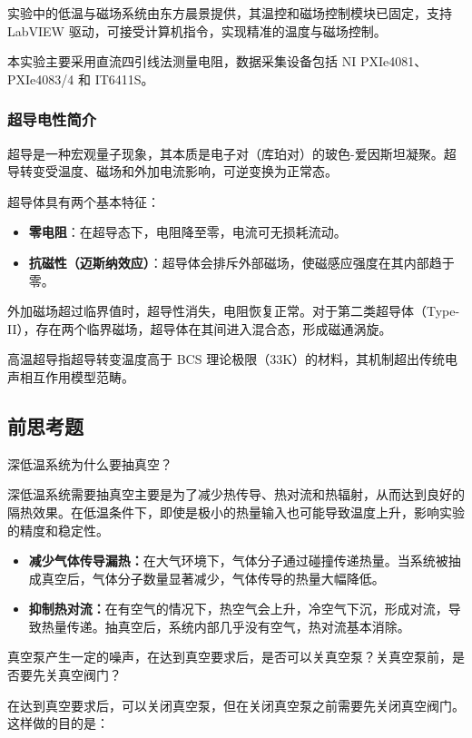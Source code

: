 实验中的低温与磁场系统由东方晨景提供，其温控和磁场控制模块已固定，支持 LabVIEW 驱动，可接受计算机指令，实现精准的温度与磁场控制。

本实验主要采用直流四引线法测量电阻，数据采集设备包括 NI PXIe4081、PXIe4083/4 和 IT6411S。

\subsubsection{超导电性简介}

超导是一种宏观量子现象，其本质是电子对（库珀对）的玻色-爱因斯坦凝聚。超导转变受温度、磁场和外加电流影响，可逆变换为正常态。

超导体具有两个基本特征：
\begin{itemize}
    \item \textbf{零电阻}：在超导态下，电阻降至零，电流可无损耗流动。
    \item \textbf{抗磁性（迈斯纳效应）}：超导体会排斥外部磁场，使磁感应强度在其内部趋于零。
\end{itemize}

外加磁场超过临界值时，超导性消失，电阻恢复正常。对于第二类超导体（Type-II），存在两个临界磁场，超导体在其间进入混合态，形成磁通涡旋。

高温超导指超导转变温度高于 BCS 理论极限（33K）的材料，其机制超出传统电声相互作用模型范畴。


\subsection{前思考题}
\begin{question}
    深低温系统为什么要抽真空？
\end{question}
深低温系统需要抽真空主要是为了减少热传导、热对流和热辐射，从而达到良好的隔热效果。在低温条件下，即使是极小的热量输入也可能导致温度上升，影响实验的精度和稳定性。

\begin{itemize}
    \item \textbf{减少气体传导漏热：}在大气环境下，气体分子通过碰撞传递热量。当系统被抽成真空后，气体分子数量显著减少，气体传导的热量大幅降低。
    \item \textbf{抑制热对流：}在有空气的情况下，热空气会上升，冷空气下沉，形成对流，导致热量传递。抽真空后，系统内部几乎没有空气，热对流基本消除。
\end{itemize}

\begin{question}
    真空泵产生一定的噪声，在达到真空要求后，是否可以关真空泵？关真空泵前，是否要先关真空阀门？
\end{question}
在达到真空要求后，可以关闭真空泵，但在关闭真空泵之前需要先关闭真空阀门。这样做的目的是：

